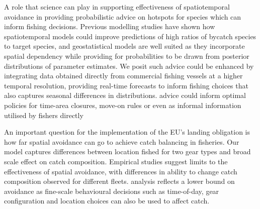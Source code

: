 \documentclass{nature}
\begin{document}
\begin{linenumbers}
A role that science can play in supporting effectiveness of spatiotemporal
avoidance in providing probabilistic advice
on hotspots for species which can inform fishing decisions. Previous modelling studies
have shown how spatiotemporal models could improve predictions of high ratios
of bycatch species to target species\cite{Ward2015, Cosandey-Godin2015,
	Breivik2016}, and geostatistical models are well suited as they incorporate spatial dependency while providing for
probabilities to be drawn from posterior distributions of parameter
estimates. We posit such advice could be enhanced by integrating
data obtained directly from commercial fishing vessels at a higher temporal
resolution, providing real-time forecasts to inform fishing choices that also
captures seasonal differences in distributions.  advice could inform optimal policies for
time-area closures, move-on rules or even as informal information utilised by fishers directly

An important question for the implementation of the EU's landing obligation is
how far spatial avoidance can go to achieve catch balancing in fisheries. Our
model captures differences between location fished for two gear types
and broad scale effect on catch composition. Empirical studies\cite{Branch2008, Kuriyama2016} suggest limits to the
effectiveness of spatial avoidance, with differences in ability to change catch
composition observed for different fleets\cite{Pascoe2007}.  analysis 
reflects a lower bound on
avoidance as fine-scale behavioural decisions such as time-of-day, gear
configuration and location choices can also be used to affect
catch\cite{Abbott2015, Thorson2016}.


\end{linenumbers}
\end{document}
